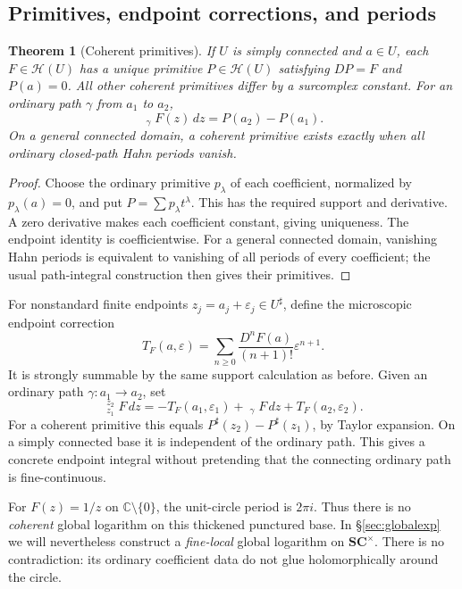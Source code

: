 \documentclass[11pt,letterpaper]{article}
\newtheorem{theorem}{Theorem}[section]
\theoremstyle{definition}
\theoremstyle{remark}
\newcommand{\SC}{\mathbf{SC}}
\newcommand{\C}{\mathbb C}
\newcommand{\HH}{\mathcal H}
\newcommand{\HInt}{\mathop{\int^{\!H}}\nolimits}
\newcommand{\sh}{^{\sharp}}
\numberwithin{equation}{section}
\begin{document}
\subsection{Primitives, endpoint corrections, and periods}
\begin{theorem}[Coherent primitives]\label{thm:primitive}
If $U$ is simply connected and $a\in U$, each $F\in\HH(U)$ has a unique primitive $P\in\HH(U)$ satisfying $DP=F$ and $P(a)=0$. All other coherent primitives differ by a surcomplex constant. For an ordinary path $\gamma$ from $a_1$ to $a_2$,
\[
 \HInt_\gamma F(z)\,dz=P(a_2)-P(a_1).
\]
On a general connected domain, a coherent primitive exists exactly when all ordinary closed-path Hahn periods vanish.
\end{theorem}
\begin{proof}
Choose the ordinary primitive $p_\lambda$ of each coefficient, normalized by $p_\lambda(a)=0$, and put $P=\sum p_\lambda t^\lambda$. This has the required support and derivative. A zero derivative makes each coefficient constant, giving uniqueness. The endpoint identity is coefficientwise. For a general connected domain, vanishing Hahn periods is equivalent to vanishing of all periods of every coefficient; the usual path-integral construction then gives their primitives.
\end{proof}
For nonstandard finite endpoints $z_j=a_j+\varepsilon_j\in U\sh$, define the microscopic endpoint correction
\[
 T_F(a,\varepsilon)
 =\sum_{n\ge0}\frac{D^nF(a)}{(n+1)!}\varepsilon^{n+1}.
\]
It is strongly summable by the same support calculation as before. Given an ordinary path $\gamma:a_1\to a_2$, set
\begin{equation}\label{eq:endpointintegral}
 \HInt_{z_1}^{z_2}F\,dz
 =-T_F(a_1,\varepsilon_1)
   +\HInt_\gamma F\,dz
   +T_F(a_2,\varepsilon_2).
\end{equation}
For a coherent primitive this equals $P\sh(z_2)-P\sh(z_1)$, by Taylor expansion. On a simply connected base it is independent of the ordinary path. This gives a concrete endpoint integral without pretending that the connecting ordinary path is fine-continuous.

For $F(z)=1/z$ on $\C\setminus\{0\}$, the unit-circle period is $2\pi i$. Thus there is no \emph{coherent} global logarithm on this thickened punctured base. In \S\ref{sec:globalexp} we will nevertheless construct a \emph{fine-local} global logarithm on $\SC^\times$. There is no contradiction: its ordinary coefficient data do not glue holomorphically around the circle.
\end{document}
